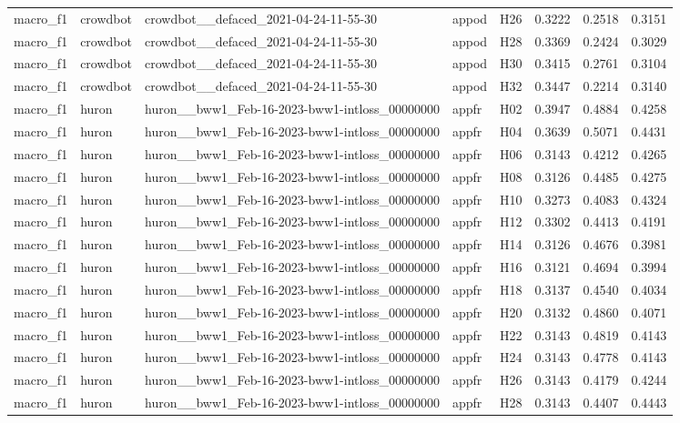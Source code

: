 \begin{table}[tbp]
\begin{tabular}{lllllrrr}
macro\_f1 & crowdbot & crowdbot\_\_defaced\_2021-04-24-11-55-30 & appod & H26 & 0.3222 & 0.2518 & 0.3151 \\
macro\_f1 & crowdbot & crowdbot\_\_defaced\_2021-04-24-11-55-30 & appod & H28 & 0.3369 & 0.2424 & 0.3029 \\
macro\_f1 & crowdbot & crowdbot\_\_defaced\_2021-04-24-11-55-30 & appod & H30 & 0.3415 & 0.2761 & 0.3104 \\
macro\_f1 & crowdbot & crowdbot\_\_defaced\_2021-04-24-11-55-30 & appod & H32 & 0.3447 & 0.2214 & 0.3140 \\
macro\_f1 & huron & huron\_\_bww1\_Feb-16-2023-bww1-intloss\_00000000 & appfr & H02 & 0.3947 & 0.4884 & 0.4258 \\
macro\_f1 & huron & huron\_\_bww1\_Feb-16-2023-bww1-intloss\_00000000 & appfr & H04 & 0.3639 & 0.5071 & 0.4431 \\
macro\_f1 & huron & huron\_\_bww1\_Feb-16-2023-bww1-intloss\_00000000 & appfr & H06 & 0.3143 & 0.4212 & 0.4265 \\
macro\_f1 & huron & huron\_\_bww1\_Feb-16-2023-bww1-intloss\_00000000 & appfr & H08 & 0.3126 & 0.4485 & 0.4275 \\
macro\_f1 & huron & huron\_\_bww1\_Feb-16-2023-bww1-intloss\_00000000 & appfr & H10 & 0.3273 & 0.4083 & 0.4324 \\
macro\_f1 & huron & huron\_\_bww1\_Feb-16-2023-bww1-intloss\_00000000 & appfr & H12 & 0.3302 & 0.4413 & 0.4191 \\
macro\_f1 & huron & huron\_\_bww1\_Feb-16-2023-bww1-intloss\_00000000 & appfr & H14 & 0.3126 & 0.4676 & 0.3981 \\
macro\_f1 & huron & huron\_\_bww1\_Feb-16-2023-bww1-intloss\_00000000 & appfr & H16 & 0.3121 & 0.4694 & 0.3994 \\
macro\_f1 & huron & huron\_\_bww1\_Feb-16-2023-bww1-intloss\_00000000 & appfr & H18 & 0.3137 & 0.4540 & 0.4034 \\
macro\_f1 & huron & huron\_\_bww1\_Feb-16-2023-bww1-intloss\_00000000 & appfr & H20 & 0.3132 & 0.4860 & 0.4071 \\
macro\_f1 & huron & huron\_\_bww1\_Feb-16-2023-bww1-intloss\_00000000 & appfr & H22 & 0.3143 & 0.4819 & 0.4143 \\
macro\_f1 & huron & huron\_\_bww1\_Feb-16-2023-bww1-intloss\_00000000 & appfr & H24 & 0.3143 & 0.4778 & 0.4143 \\
macro\_f1 & huron & huron\_\_bww1\_Feb-16-2023-bww1-intloss\_00000000 & appfr & H26 & 0.3143 & 0.4179 & 0.4244 \\
macro\_f1 & huron & huron\_\_bww1\_Feb-16-2023-bww1-intloss\_00000000 & appfr & H28 & 0.3143 & 0.4407 & 0.4443 \\

\end{tabular}
\end{table}
